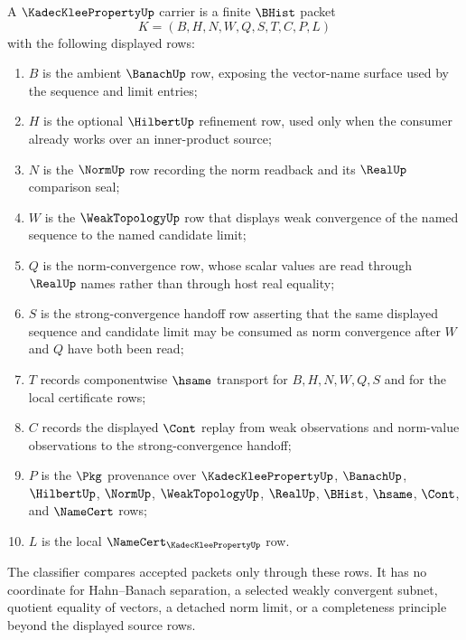 \begin{definition}
\label{def:kadec-klee-property-carrier}
A $\KadecKleePropertyUp$ carrier is a finite $\BHist$ packet
$$
K=(B,H,N,W,Q,S,T,C,P,L)
$$
with the following displayed rows:
\begin{enumerate}
\item $B$ is the ambient $\BanachUp$ row, exposing the vector-name surface used by the sequence and limit entries;
\item $H$ is the optional $\HilbertUp$ refinement row, used only when the consumer already works over an inner-product source;
\item $N$ is the $\NormUp$ row recording the norm readback and its $\RealUp$ comparison seal;
\item $W$ is the $\WeakTopologyUp$ row that displays weak convergence of the named sequence to the named candidate limit;
\item $Q$ is the norm-convergence row, whose scalar values are read through $\RealUp$ names rather than through host real equality;
\item $S$ is the strong-convergence handoff row asserting that the same displayed sequence and candidate limit may be consumed as norm convergence after $W$ and $Q$ have both been read;
\item $T$ records componentwise $\hsame$ transport for $B,H,N,W,Q,S$ and for the local certificate rows;
\item $C$ records the displayed $\Cont$ replay from weak observations and norm-value observations to the strong-convergence handoff;
\item $P$ is the $\Pkg$ provenance over $\KadecKleePropertyUp$, $\BanachUp$, $\HilbertUp$, $\NormUp$, $\WeakTopologyUp$, $\RealUp$, $\BHist$, $\hsame$, $\Cont$, and $\NameCert$ rows;
\item $L$ is the local $\NameCert_{\KadecKleePropertyUp}$ row.
\end{enumerate}
The classifier compares accepted packets only through these rows. It has no coordinate for Hahn--Banach separation, a selected weakly convergent subnet, quotient equality of vectors, a detached norm limit, or a completeness principle beyond the displayed source rows.
\end{definition}

